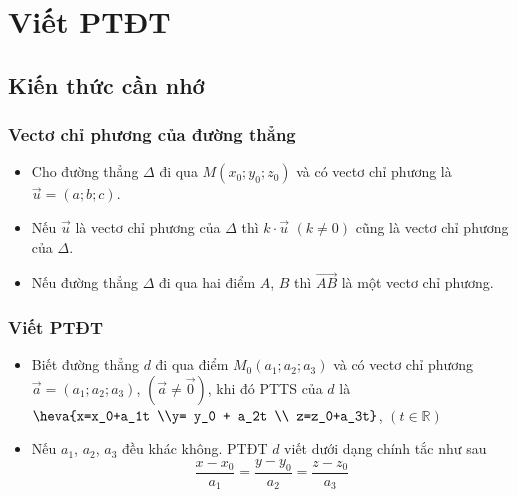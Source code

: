 \setcounter{section}{35}
\setcounter{ex}{0}
\section{Viết PTĐT}
\subsection{Kiến thức cần nhớ}
\begin{khung}
	\subsubsection{Vectơ chỉ phương của đường thẳng}
	\begin{itemize}
\item  Cho đường thẳng $\Delta$ đi qua $M(x_0;y_0;z_0)$ và có vectơ chỉ phương là $\vec{u}=(a;b;c)$.
\item Nếu $\vec{u}$ là vectơ chỉ phương của $\Delta$ thì $k\cdot\vec{u}$ $(k\ne 0)$ cũng là vectơ chỉ phương của $\Delta$.
\item Nếu đường thẳng $\Delta$ đi qua hai điểm $A$, $B$ thì $\overrightarrow{AB}$ là một vectơ chỉ phương.
	\end{itemize}
	\subsubsection{Viết PTĐT}
	\begin{itemize}
\item Biết đường thẳng $d$ đi qua điểm $M_0(a_1;a_2;a_3)$ và có vectơ chỉ phương $\vec{a}=(a_1;a_2;a_3)$, $(\vec{a}\neq \vec{0})$, khi đó PTTS của $d$ là $\heva{x=x_0+a_1t \\y= y_0 + a_2t \\ z=z_0+a_3t}$, $(t\in\mathbb{R})$
\item Nếu $a_1$, $a_2$, $a_3$ đều khác không. PTĐT $d$ viết dưới dạng chính tắc như sau
\[\dfrac{x-x_0}{a_1}=\dfrac{y-y_0}{a_2}=\dfrac{z-z_0}{a_3}\]
	\end{itemize}
\end{khung}
